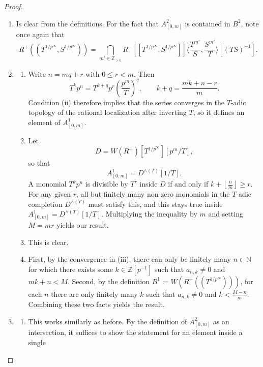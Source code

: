 \documentclass[10pt,twoside]{article}
\numberwithin{equation}{section}
\theoremstyle{plain}
\theoremstyle{definition}
\newcommand{\ZZ}{\mathbb{Z}}
\newcommand{\NN}{\mathbb{N}}
\newcommand{\pRoots}{{1/p^\infty}}
\newcommand{\ZZip}{\ZZ[p^{-1}]}
\newcommand{\ZZgz}{\ZZ_{> 0}}
\renewcommand{\Langle}{\Big\langle}
\renewcommand{\Rangle}{\Big\rangle}
\begin{document}
    \begin{proof}
        \begin{enumerate}
        \item Is clear from the definitions. For the fact that \(A^2_{[0,m]}\) is contained in \(B^2\), note once again that
        \[R^+((T^{\pRoots}, S^{\pRoots}))=\bigcap_{m'\in \ZZgz}R^+[[T^{\pRoots},S^{\pRoots}]]\Langle \frac{T^{m'}}S, \frac {S^{m'}}{T}\Rangle[(TS)^{-1}].\]
        \item\begin{enumerate}[align=left]
                    \item[(ii) \(\implies\) (i)] Write \(n=mq+r\) with \(0\leq r<m\). Then
                    \[T^kp^n=T^{k+q}p^r\left(\frac{p^m}{T}\right)^q,\qquad k+q=\frac{mk+n-r}{m}.\]
                    Condition (ii) therefore implies that the series converges in the \(T\)-adic topology of the rational localization after inverting \(T\), so it defines an element of \(A^1_{[0,m]}\).
                \item[(i) \(\implies\) (ii)]
                Let \[D=W(R^+)[T^{\pRoots}][p^m/T],\] so that
                \[A^1_{[0,m]}=D^{\wedge(T)}[1/T].\]
                A monomial \(T^kp^n\) is divisible by \(T^r\) inside \(D\) if and only if \(k+\left\lfloor\frac{n}{m}\right\rfloor\geq r\). For any given \(r\), all but finitely many non-zero monomials in the \(T\)-adic completion \(D^{\wedge(T)}\) must satisfy this, and this stays true inside \(A^1_{[0,m]}=D^{\wedge(T)}[1/T]\). Multiplying the inequality by \(m\) and setting \(M=mr\) yields our result.
                    \item[(ii) \(\implies\) (iii)] This is clear.
                \item[(iii) \(\implies\) (ii)] First, by the convergence in (iii), there can only be finitely many \(n\in \NN\) for which there exists some \(k\in \ZZip\) such that \(a_{n,k}\neq 0\) and \(mk+n<M\). Second, by the definition \(B^1\coloneqq W(R^+((T^{\pRoots})))\), for each \(n\) there are only finitely many \(k\) such that \(a_{n,k}\neq 0\) and \(k<\frac{M-n}{m}\). Combining these two facts yields the result.
                \end{enumerate}
        \item\begin{enumerate}[align=left]
            \item[(i) \(\implies\) (ii)]
                This works similarly as before. By the definition of \(A^2_{[0,m]}\) as an intersection, it suffices to show the statement for an element inside a single

\end{enumerate}
\end{enumerate}
\end{proof}
\end{document}

